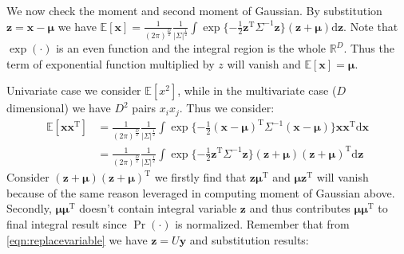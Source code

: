 We now check the moment and second moment of Gaussian. By substitution
$\mathbf{z}=\mathbf{x}-\boldsymbol{\mu}$ we have
$\mathbb{E}[\mathbf{x}]=\frac{1}{(2\pi)^{\frac{D}{2}}}\frac{1}{\vert\Sigma\vert^{\frac{1}{2}}}\int{}\exp{}\{-\frac{1}{2}\mathbf{z}^{\mathrm{T}}\Sigma^{-1}\mathbf{z}\}(\mathbf{z}+\boldsymbol{\mu})\text{d}\mathbf{z}$.
Note that $\exp(\cdot)$ is an even function and the integral region is
the whole $\mathbb{R}^{D}$. Thus the term of exponential function
multiplied by $z$ will vanish and
$\mathbb{E}[\mathbf{x}]=\boldsymbol{\mu}$.


Univariate case we consider $\mathbb{E}[x^2]$, while in the multivariate
case ($D$ dimensional) we have $D^2$ pairs $x_{i}x_{j}$. Thus we
consider:
\begin{equation}
\begin{split}
\mathbb{E}[\mathbf{x}\mathbf{x}^{\mathrm{T}}]&=\frac{1}{(2\pi)^{\frac{D}{2}}}\frac{1}{\vert\Sigma\vert^{\frac{1}{2}}}\int{}\exp{}\{-\frac{1}{2}(\mathbf{x}-\boldsymbol{\mu})^{\mathrm{T}}\Sigma^{-1}(\mathbf{x}-\boldsymbol{\mu})\}\mathbf{x}\mathbf{x}^{\mathrm{T}}\text{d}\mathbf{x}\\
&=\frac{1}{(2\pi)^{\frac{D}{2}}}\frac{1}{\vert\Sigma\vert^{\frac{1}{2}}}\int{}\exp{}\{-\frac{1}{2}\mathbf{z}^{\mathrm{T}}\Sigma^{-1}\mathbf{z}\}(\mathbf{z}+\boldsymbol{\mu})(\mathbf{z}+\boldsymbol{\mu})^{\mathrm{T}}\text{d}\mathbf{z}
\end{split}        
\label{eqn:secondmomentgaussian}
\end{equation}
Consider
$(\mathbf{z}+\boldsymbol{\mu})(\mathbf{z}+\boldsymbol{\mu})^{\mathrm{T}}$
we firstly find that $\mathbf{z}\boldsymbol{\mu}^{\mathrm{T}}$ and
$\boldsymbol{\mu}\mathbf{z}^{\mathrm{T}}$ will vanish because of the
same reason leveraged in computing moment of Gaussian above. Secondly,
     $\boldsymbol{\mu}\boldsymbol{\mu}^{\mathrm{T}}$ doesn't contain
     integral variable $\mathbf{z}$ and thus contributes
     $\boldsymbol{\mu}\boldsymbol{\mu}^{\mathrm{T}}$ to final integral
     result since $\Pr(\cdot)$ is normalized. Remember that from
     \eqref{eqn:replacevariable} we have $\mathbf{z}=U\mathbf{y}$ and
     substitution results:
